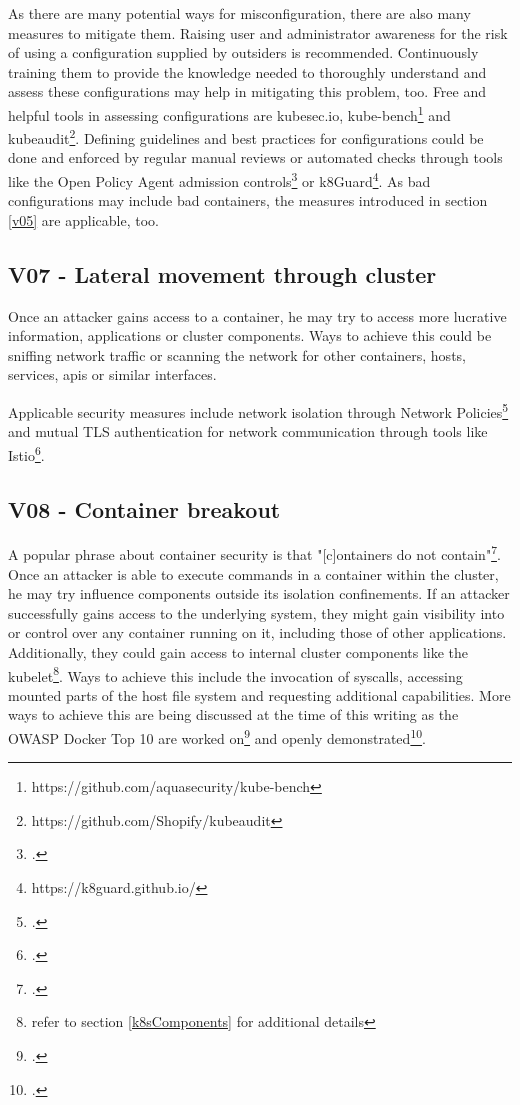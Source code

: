 As there are many potential ways for misconfiguration, there are also many measures to mitigate them.
Raising user and administrator awareness for the risk of using a configuration supplied by outsiders is recommended. Continuously training them to provide the knowledge needed to thoroughly understand and assess these configurations may help in mitigating this problem, too. 
Free and helpful tools in assessing configurations are kubesec.io, kube-bench\footnote{https://github.com/aquasecurity/kube-bench} and kubeaudit\footnote{https://github.com/Shopify/kubeaudit}.
Defining guidelines and best practices for configurations could be done and enforced by regular manual reviews or automated checks through tools like the Open Policy Agent admission controls\footcite[][, section 'Wrap Up']{opaAdmission} or k8Guard\footnote{https://k8guard.github.io/}.
As bad configurations may include bad containers, the measures introduced in section \ref{v05} are applicable, too.

\subsection{V07 - Lateral movement through cluster} \label{v07}
Once an attacker gains access to a container, he may try to access more lucrative information, applications or cluster components. Ways to achieve this could be sniffing network traffic or scanning the network for other containers, hosts, services, apis or similar interfaces.

Applicable security measures include network isolation through Network Policies\footcite[][, section 'The NetworkPolicy Resource']{netPols} and mutual TLS authentication for network communication through tools like Istio\footcite[][, section 'Mutual TLS authentication']{istioMtls}.

\subsection{V08 - Container breakout} \label{v08}
A popular phrase about container security is that "[c]ontainers do not contain"\footcite[][, first headline]{doNotContain}.
Once an attacker is able to execute commands in a container within the cluster, he may try influence components outside its isolation confinements. 
If an attacker successfully gains access to the underlying system, they might gain visibility into or control over any container running on it, including those of other applications. Additionally, they could gain access to internal cluster components like the kubelet\footnote{refer to section \ref{k8sComponents} for additional details}.
Ways to achieve this include the invocation of syscalls, accessing mounted parts of the host file system and requesting additional capabilities. More ways to achieve this are being discussed at the time of this writing as the OWASP Docker Top 10 are worked on\footcite[][, dialogue by GitHub users 'drwetter', 'gramsimamsi' and 'wurstbrot']{dockerTop10GithubIssue} and openly demonstrated\footcite[][, section 'Breaking down the proof of concept']{trailOfBitsEscape}.

